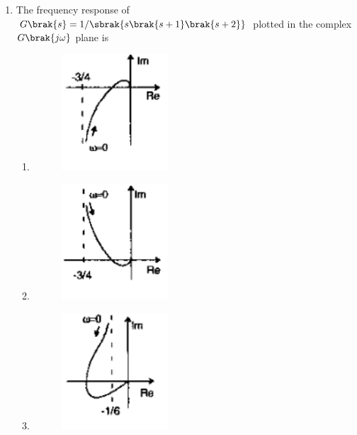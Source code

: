 \documentclass[12pt]{article}
\theoremstyle{remark}
\begin{document}
\begin{enumerate}
\item The frequency response of $G\brak{s}=1/\sbrak{s\brak{s+1}\brak{s+2}}$ plotted in the complex $G\brak{j\omega}$ plane  is
\begin{enumerate}
    \item \begin{figure}[H]\centering\includegraphics[width=0.4\textwidth]{Figs/Q36A.png}\caption{}\label{fig:1.25}\end{figure}
    \item \begin{figure}[H]\centering\includegraphics[width=0.4\textwidth]{Figs/Q36B.png}\caption{}\label{fig:1.26}\end{figure}
    \item \begin{figure}[H]\centering\includegraphics[width=0.4\textwidth]{Figs/Q36C.png}\caption{}\label{fig:1.27}\end{figure}

\end{enumerate}
\end{enumerate}
\end{document}
